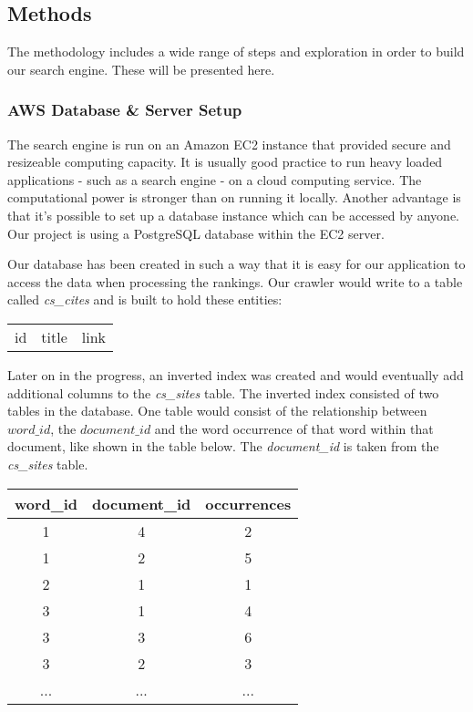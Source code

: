 
\subsection{Methods} %
\label{sub:methods}
The methodology includes a wide range of steps and exploration in order to build our search engine. These will be presented here.

\subsubsection{AWS Database \& Server Setup} %
\label{ssub:database_and_server_setup}

The search engine is run on an Amazon EC2 instance that provided secure and resizeable computing capacity. It is usually good practice to run heavy loaded applications - such as a search engine - on a cloud computing service. The computational power is stronger than on running it locally. Another advantage is that it's possible to set up a database instance which can be accessed by anyone. Our project is using a PostgreSQL database within the EC2 server.

Our database has been created in such a way that it is easy for our application to access the data when processing the rankings. Our crawler would write to a table called \emph{cs\_cites} and is built to hold these entities:

\begin{center}
  \begin{tabular}{|c|c|c|}
  id & title & link
  \end{tabular}
\end{center}

Later on in the progress, an inverted index was created and would eventually add additional columns to the \emph{cs\_sites} table. The inverted index consisted of two tables in the database. One table would consist of the relationship between $word\_id$, the $document\_id$ and the word occurrence of that word within that document, like shown in the table below. The \emph{document\_id} is taken from the \emph{cs\_sites} table.

\begin{table}[h!]
  \begin{tabular}{|c|c|c|}
  \hline
  word\_id & document\_id & occurrences \\ \hline 
  1 & 4 & 2 \\\hline
  1 & 2 & 5 \\\hline
  2 & 1 & 1 \\\hline
  3 & 1 & 4 \\\hline
  3 & 3 & 6 \\\hline
  3 & 2 & 3 \\\hline
  ... & ... & ...
  \end{tabular}
\end{table}

